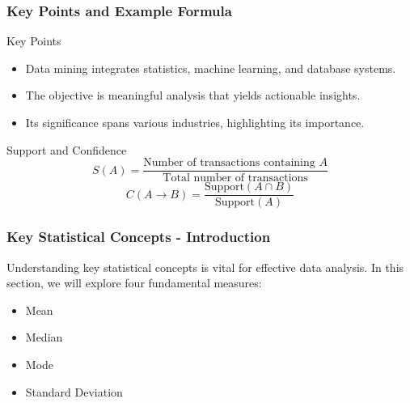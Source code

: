 \documentclass[aspectratio=169]{beamer}
\begin{document}
\begin{frame}[fragile]
    \frametitle{Key Points and Example Formula}
    \begin{block}{Key Points}
        \begin{itemize}
            \item Data mining integrates statistics, machine learning, and database systems.
            \item The objective is meaningful analysis that yields actionable insights.
            \item Its significance spans various industries, highlighting its importance.
        \end{itemize}
    \end{block}
    
    \begin{block}{Support and Confidence}
        \begin{equation}
            S(A) = \frac{\text{Number of transactions containing } A}{\text{Total number of transactions}}
        \end{equation}
        \begin{equation}
            C(A \rightarrow B) = \frac{\text{Support}(A \cap B)}{\text{Support}(A)}
        \end{equation}
    \end{block}
\end{frame}

\begin{frame}[fragile]
    \frametitle{Key Statistical Concepts - Introduction}
    Understanding key statistical concepts is vital for effective data analysis. In this section, we will explore four fundamental measures: 
    \begin{itemize}
        \item Mean
        \item Median
        \item Mode
        \item Standard Deviation
    \end{itemize}
\end{frame}
\end{document}
